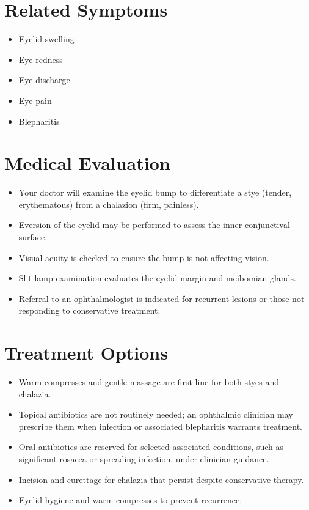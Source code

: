 \section*{Related Symptoms}
\begin{itemize}
  \item Eyelid swelling
  \item Eye redness
  \item Eye discharge
  \item Eye pain
  \item Blepharitis
\end{itemize}

\section*{Medical Evaluation}
\begin{itemize}
  \item Your doctor will examine the eyelid bump to differentiate a stye (tender, erythematous) from a chalazion (firm, painless).
  \item Eversion of the eyelid may be performed to assess the inner conjunctival surface.
  \item Visual acuity is checked to ensure the bump is not affecting vision.
  \item Slit-lamp examination evaluates the eyelid margin and meibomian glands.
  \item Referral to an ophthalmologist is indicated for recurrent lesions or those not responding to conservative treatment.
\end{itemize}

\section*{Treatment Options}
\begin{itemize}
  \item Warm compresses and gentle massage are first-line for both styes and chalazia.
  \item Topical antibiotics are not routinely needed; an ophthalmic clinician may prescribe them when infection or associated blepharitis warrants treatment.
  \item Oral antibiotics are reserved for selected associated conditions, such as significant rosacea or spreading infection, under clinician guidance.
  \item Incision and curettage for chalazia that persist despite conservative therapy.
  \item Eyelid hygiene and warm compresses to prevent recurrence.
\end{itemize}


